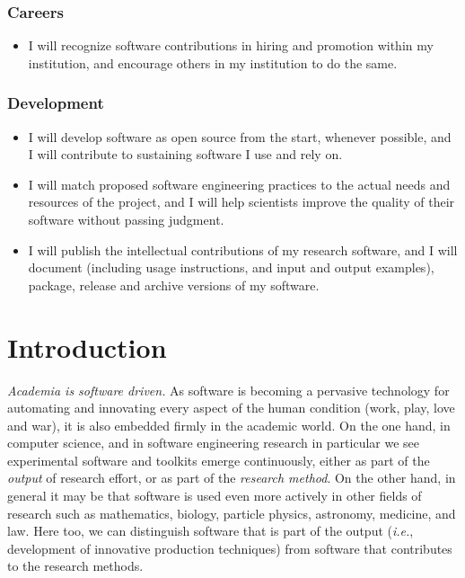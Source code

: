 \documentclass[a4paper,UKenglish]{dagman}
\renewcommand{\paragraph}[1]{\subsubsection*{#1}\xspace}
\newcommand{\ie}{\emph{i.e.},\xspace}
\begin{document}
\paragraph{Careers}
\begin{itemize}
\item I will recognize software contributions in hiring and promotion within my institution, and encourage others in my institution to do the same.
\end{itemize}

\paragraph{Development}
\begin{itemize}
\item I will develop software as open source from the start, whenever possible, and I will contribute to sustaining software I use and rely on.
\item I will match proposed software engineering practices to the actual needs and resources of the project, and I will help scientists improve the quality of their software without passing judgment.
\item I will publish the intellectual contributions of my research software, and I will document (including usage instructions, and input and output examples), package, release and archive versions of my software.  
\end{itemize}

\tableofcontents

\section{Introduction}

\emph{Academia is software driven.} As software is becoming a pervasive technology for automating and innovating every aspect of the human condition (work, play, love and war), it is also embedded firmly in the academic world. On the one hand, in computer science, and in software engineering research in particular we see experimental software and toolkits emerge continuously, either as part of the \emph{output} of research effort, or as part of the \emph{research method}. On the other hand, in general it may be that software is used even more actively in other fields of research such as mathematics, biology, particle physics, astronomy, medicine, and law. Here too, we can distinguish software that is part of the output (\ie development of innovative production techniques) from software that contributes to the research methods. 
\end{document}
